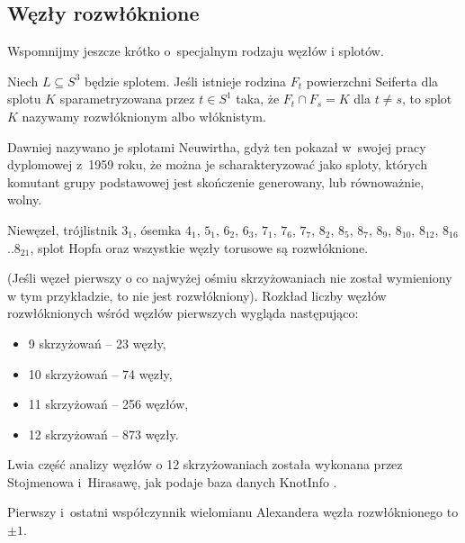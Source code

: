 
\subsection{Węzły rozwłóknione}
%
%
Wspomnijmy jeszcze krótko o~specjalnym rodzaju węzłów i splotów.

\begin{definition}
    Niech $L \subseteq S^3$ będzie splotem.
    Jeśli istnieje rodzina $F_t$ powierzchni Seiferta dla splotu $K$ sparametryzowana przez $t \in S^1$ taka, że $F_t \cap F_s = K$ dla $t \neq s$, to splot $K$ nazywamy rozwłóknionym albo włóknistym.
\end{definition}

%
Dawniej nazywano je splotami Neuwirtha, gdyż ten pokazał w~swojej pracy dyplomowej z~1959 roku, że można je scharakteryzować jako sploty, których komutant grupy podstawowej jest skończenie generowany, lub równoważnie, wolny.

\begin{example}
    Niewęzeł, trójlistnik $3_1$, ósemka $4_1$, $5_{1}$, $6_{2}$, $6_{3}$, $7_{1}$, $7_{6}$, $7_{7}$, $8_{2}$, $8_{5}$, $8_{7}$, $8_{9}$, $8_{10}$, $8_{12}$, $8_{16}$..$8_{21}$, splot Hopfa oraz wszystkie węzły torusowe są rozwłóknione.
\end{example}

(Jeśli węzeł pierwszy o co najwyżej ośmiu skrzyżowaniach nie został wymieniony w tym przykładzie, to nie jest rozwłókniony).
Rozkład liczby węzłów rozwłóknionych wśród węzłów pierwszych wygląda następująco:
\begin{itemize}
\item 9 skrzyżowań -- 23 węzły,
\item 10 skrzyżowań -- 74 węzły,
\item 11 skrzyżowań -- 256 węzłów,
\item 12 skrzyżowań -- 873 węzły.
\end{itemize}

Lwia część analizy węzłów o 12 skrzyżowaniach została wykonana przez Stojmenowa i~Hirasawę, jak podaje baza danych KnotInfo \cite{knotinfo22}.
%
%

\begin{proposition}
%
    Pierwszy i~ostatni współczynnik wielomianu Alexandera węzła rozwłóknionego to $\pm 1$.
\end{proposition}

